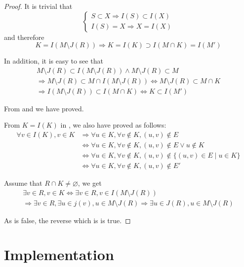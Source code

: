 \documentclass[a4paper,12pt]{article}
\makeatletter
\renewcommand*{\eqref}[1]{\hyperref[{#1}]{\textup{\tagform@{\ref*{#1}}}}}
\makeatother
\begin{document}
\begin{proof}
It is trivial that
\[\begin{cases}
  S \subset X \Longrightarrow I(S) \subset I(X)\\
  I(S) = X \Longrightarrow X = I(X)
\end{cases}\]
and therefore
\begin{equation}\label{left}
  K = I(M \setminus J(R))
  \Longrightarrow K = I(K) \supset I(M \cap K) = I(M')
\end{equation}

In addition, it is easy to see that
\begin{multline}\label{right}
  M \setminus J(R) \subset I(M \setminus J(R))
  \wedge M \setminus J(R) \subset M\\
  \Longrightarrow M \setminus J(R) \subset M \cap I(M \setminus J(R))
  \iff M \setminus J(R) \subset M \cap K\\
  \Longrightarrow I(M \setminus J(R)) \subset I(M \cap K)
  \iff K \subset I(M')
\end{multline}

From \eqref{left} and \eqref{right} we have \eqref{output-useful} proved.

From $K = I(K)$ in \eqref{left}, we also have
\eqref{output-digraph} proved as follows:
\begin{align*}
  \forall v \in I(K), v \in K
  &\Longrightarrow \forall u \in K, \forall v \notin K, (u, v) \notin E\\
  &\iff \forall u \in K, \forall v \notin K,
  (u, v) \notin E \vee u \notin K\\
  &\iff \forall u \in K, \forall v \notin K,
  (u, v) \notin \{(u, v) \in E \mid u \in K\}\\
  &\iff \forall u \in K, \forall v \notin K, (u, v) \notin E'
\end{align*}

Assume that $R \cap K \neq \varnothing$, we get
\begin{multline}\label{c11n}
  \exists v \in R, v \in K
  \iff \exists v \in R, v \in I(M \setminus J(R))\\
  \Longrightarrow \exists v \in R, \exists u \in j(v), u \in M \setminus J(R)
  \Longrightarrow \exists u \in J(R), u \in M \setminus J(R)
\end{multline}

As \eqref{c11n} is false, the reverse which is \eqref{rm} is true.
\end{proof}

\section{Implementation}
\end{document}

